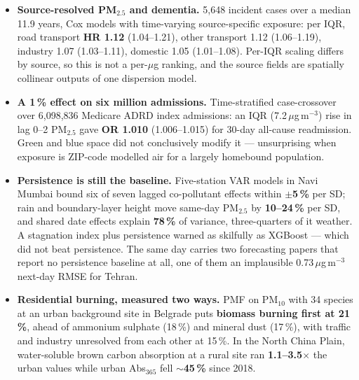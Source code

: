 \documentclass[10pt]{article}
\begin{document}
\footnotesize
\begin{itemize}

\item \textbf{Source-resolved PM$_{2.5}$ and dementia.} 5,648 incident cases over a median 11.9 years, Cox
models with time-varying source-specific exposure: per IQR, road transport \textbf{HR 1.12} (1.04--1.21),
other transport 1.12 (1.06--1.19), industry 1.07 (1.03--1.11), domestic 1.05 (1.01--1.08). Per-IQR scaling
differs by source, so this is not a per-$\mu$g ranking, and the source fields are spatially collinear
outputs of one dispersion model.

\item \textbf{A 1\,\% effect on six million admissions.} Time-stratified case-crossover over 6,098,836
Medicare ADRD index admissions: an IQR (7.2\,$\mu$g\,m$^{-3}$) rise in lag 0--2 PM$_{2.5}$ gave
\textbf{OR 1.010} (1.006--1.015) for 30-day all-cause readmission. Green and blue space did not
conclusively modify it --- unsurprising when exposure is ZIP-code modelled air for a largely homebound
population.

\item \textbf{Persistence is still the baseline.} Five-station VAR models in Navi Mumbai bound six of seven
lagged co-pollutant effects within \textbf{$\pm$5\,\%} per SD; rain and boundary-layer height move same-day
PM$_{2.5}$ by \textbf{10--24\,\%} per SD, and shared date effects explain \textbf{78\,\%} of variance,
three-quarters of it weather. A stagnation index plus persistence warned as skilfully as XGBoost --- which
did not beat persistence. The same day carries two forecasting papers that report no persistence baseline
at all, one of them an implausible 0.73\,$\mu$g\,m$^{-3}$ next-day RMSE for Tehran.

\item \textbf{Residential burning, measured two ways.} PMF on PM$_{10}$ with 34 species at an urban
background site in Belgrade puts \textbf{biomass burning first at 21\,\%}, ahead of ammonium sulphate
(18\,\%) and mineral dust (17\,\%), with traffic and industry unresolved from each other at 15\,\%. In the
North China Plain, water-soluble brown carbon absorption at a rural site ran \textbf{1.1--3.5$\times$} the
urban values while urban Abs$_{365}$ fell \textbf{$\sim$45\,\%} since 2018.

\end{itemize}

\vspace{2mm}
\end{document}
